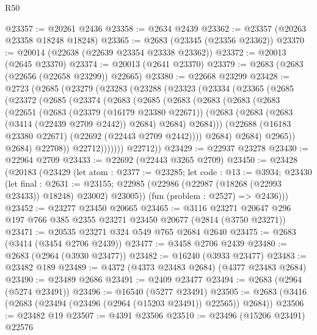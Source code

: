 \begin{lexlean}{R50}
\begin{coremodule}
@23357 := @20261 @2436
@23358 := @2634 @2439
@23362 := @23357 (@20263 @23358 @18248 @18248)
@23365 := @2683 (@23345 (@23356 @23362))
@23370 := @20014 (@22638 (@22639 @23354 @23338 @23362))
@23372 := @20013 (@2645 @23370)
@23374 := @20013 (@2641 @23370)
@23379 := @2683 (@2683 (@22656 (@22658 @23299)) @22665)
@23380 := @22668 @23299
@23428 := @2723
    (@2685
      (@23279
        (@23283
          (@23288
            (@23323
              (@23334
                (@23365
                  (@2685
                    (@23372
                      (@2685
                        (@23374
                          (@2683
                            (@2685
                              (@2683
                                (@2683
                                  (@2683
                                    (@2683
                                      (@22651
                                        (@2683
                                          (@23379 (@16179 @23380 @22671))
                                          (@2683
                                            (@2683 (@2683 (@3414 (@22439 @2709 @2442)) @2684) @2684)
                                            @2684)))
                                      (@22688 (@16183 @23380 @22671) (@22692 (@22443 @2709 @2442))))
                                    @2684)
                                  @2684)
                                @2965))
                            @2684)
                          @22708))
                      @22712)))))))
        @22712))
@23429 := @22937 @23278
@23430 := @22964 @2709
@23433 := @22692 (@22443 @3265 @2709)
@23450 := @23428
    (@20183
      (@23429
        (let atom : @2377 := @23285;
        let code : @13 := @3934;
        @23430
          (let final : @2631 := @23155;
          @22985 (@22986 (@22987 (@18268 (@22993 @23433)) @18248) @23002) @23005))
        (fun (problem : @2527) => @2436)))
@23452 := @23277 @23450 @20665
@23465 := @3116 @23271 @20647 @296 @197 @766 @385 @2355 @23271 @23450 @20677 (@2814 (@3750 @23271))
@23471 := @20535 @23271 @324 @549 @765 @2684 @2640
@23475 := @2683 (@3414 (@3454 @2706 @2439))
@23477 := @3458 @2706 @2439
@23480 := @2683 (@2964 (@3930 @23477))
@23482 := @16240 (@3933 @23477)
@23483 := @23482 @189
@23489 := @4372 (@4373 @23483 @2684) (@4377 @23483 @2684)
@23490 := @23489 @2686
@23491 := @2409 @23477
@23494 := @2683 (@2964 (@5274 @23491))
@23496 := @16540 (@5277 @23491)
@23505 := @2683 (@3416 (@2683 (@23494 (@23496 (@2964 (@15203 @23491)) @22565)) @2684))
@23506 := @23482 @19
@23507 := @4391 @23506
@23510 := @23496 (@15206 @23491) @22576

\end{coremodule}
\end{lexlean}
